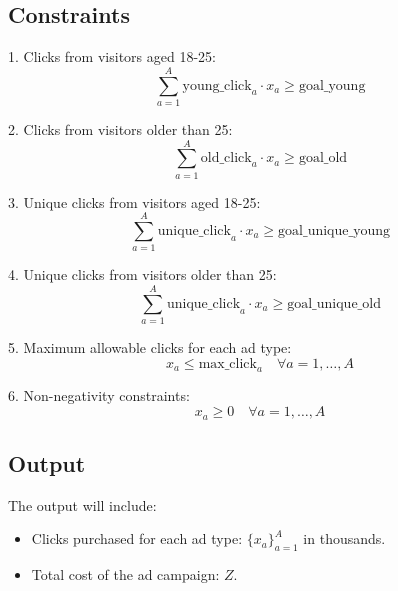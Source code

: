 \documentclass{article}
\begin{document}
\subsection*{Constraints}
1. Clicks from visitors aged 18-25:
\[
\sum_{a=1}^{A} \text{young\_click}_{a} \cdot x_{a} \geq \text{goal\_young}
\]

2. Clicks from visitors older than 25:
\[
\sum_{a=1}^{A} \text{old\_click}_{a} \cdot x_{a} \geq \text{goal\_old}
\]

3. Unique clicks from visitors aged 18-25:
\[
\sum_{a=1}^{A} \text{unique\_click}_{a} \cdot x_{a} \geq \text{goal\_unique\_young}
\]

4. Unique clicks from visitors older than 25:
\[
\sum_{a=1}^{A} \text{unique\_click}_{a} \cdot x_{a} \geq \text{goal\_unique\_old}
\]

5. Maximum allowable clicks for each ad type:
\[
x_{a} \leq \text{max\_click}_{a} \quad \forall a = 1, \ldots, A
\]

6. Non-negativity constraints:
\[
x_{a} \geq 0 \quad \forall a = 1, \ldots, A
\]

\subsection*{Output}
The output will include:
\begin{itemize}
    \item Clicks purchased for each ad type: \( \{ x_{a} \}_{a=1}^{A} \) in thousands.
    \item Total cost of the ad campaign: \( Z \).
\end{itemize}
\end{document}

